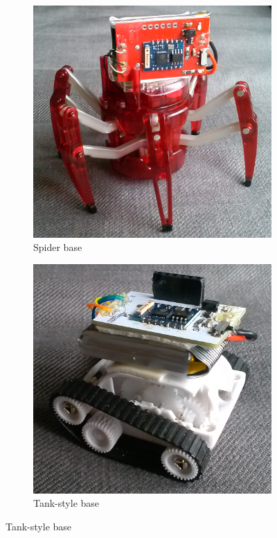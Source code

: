 \documentclass[letterpaper, 10 pt, conference]{ieeeconf}  %
\begin{document}
\begin{figure}
	\centering
	\begin{subfigure}{0.22\textwidth}
		\centering
		\includegraphics[width=\linewidth]{tiny_spider}
		\caption{Spider base}
		\label{fig:sub1}
	\end{subfigure}%
	\begin{subfigure}{0.22\textwidth}
		\centering
		\includegraphics[width=\linewidth]{tiny_tank}
		\caption{Tank-style base}
		\label{fig:sub2}
	\end{subfigure}
	\label{fig:test}
\end{figure}
\end{document}
